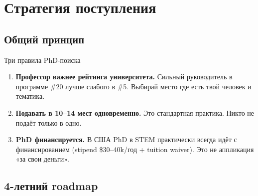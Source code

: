 \documentclass[10pt, a4paper]{article}
\begin{document}
\section{Стратегия поступления}

\subsection{Общий принцип}

\begin{stratbox}{Три правила PhD-поиска}
\begin{enumerate}[leftmargin=1.5em, itemsep=3pt]
  \item \textbf{Профессор важнее рейтинга университета.} Сильный руководитель в программе \#20 лучше слабого в \#5. Выбирай место где есть твой человек и тематика.
  \item \textbf{Подавать в 10–14 мест одновременно.} Это стандартная практика. Никто не подаёт только в одно.
  \item \textbf{PhD финансируется.} В США PhD в STEM практически всегда идёт с финансированием (stipend \$30–40k/год + tuition waiver). Это не аппликация «за свои деньги».
\end{enumerate}
\end{stratbox}

\subsection{4-летний roadmap}
\end{document}

